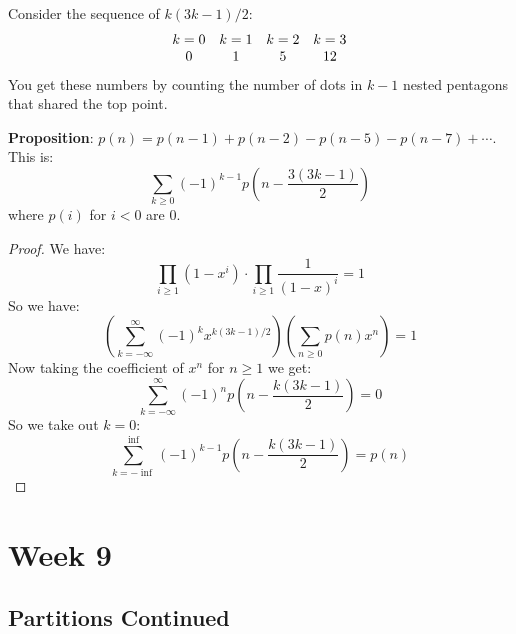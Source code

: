 \documentclass{report}
\begin{document}
Consider the sequence of $k(3k - 1)/2$:
    \begin{align*}
        \begin{array}{ c c c c }
            k = 0 & k = 1 & k = 2 & k = 3 \\
            0     & 1     & 5     & 12      
        \end{array}
    \end{align*}
You get these numbers by counting the number of dots in $k - 1$ nested pentagons that shared the top point.

\textbf{Proposition}: $p(n) = p(n - 1) + p(n - 2) - p(n - 5) - p(n - 7) + \cdots $. This is:
    \begin{equation*}
        \sum_{k \geq 0} (-1)^{k - 1}p(n - \dfrac{3(3k - 1)}{2})
    \end{equation*}
where $p(i)$ for $i < 0$ are $0$.
    \begin{proof}
        We have:
            \begin{equation*}
                \prod_{i \geq 1}(1 - x^{i}) \cdot \prod_{i \geq 1}\dfrac{1}{(1 - x)^{i}} = 1
            \end{equation*}
        So we have:
            \begin{equation*}
                \left(\sum_{k = -\infty }^{\infty }(-1)^{k}x^{k(3k - 1)/2}\right)\left(\sum_{n \geq 0}p(n)x^{n}\right) = 1
            \end{equation*}
        Now taking the coefficient of $x^{n}$ for $n \geq 1$ we get:
            \begin{equation*}
                \sum_{k = -\infty }^{\infty }(-1)^{n}p(n - \dfrac{k(3k - 1)}{2}) = 0
            \end{equation*}
        So we take out $k = 0$:
            \begin{equation*}
                \sum_{k = -\inf}^{\inf}(-1)^{k - 1}p(n - \dfrac{k(3k - 1)}{2}) = p(n)
            \end{equation*}
    \end{proof}

\chapter{Week 9}

\begin{topic}
    \section{Partitions Continued}
\end{topic}
\end{document}
